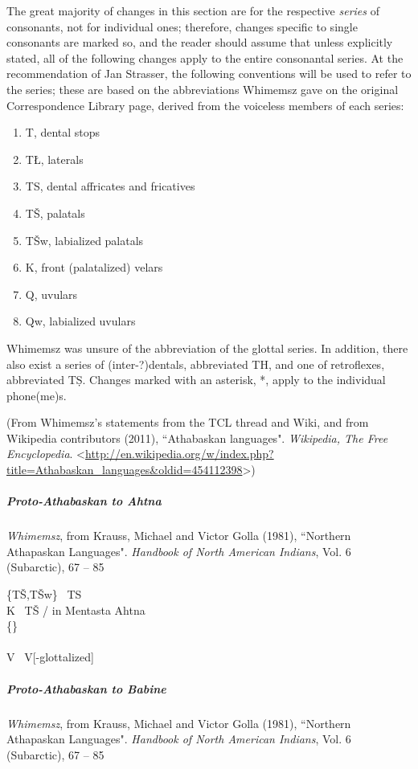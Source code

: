\documentclass[11pt]{article}
\newcommand{\ipa}{\textipa}
\newcommand{\tab}{\hspace{25pt}}
\newcommand{\change}{\textrightarrow}
\begin{document}
\tab The great majority of changes in this section are for the respective \textit{series} of consonants, not for individual ones; therefore, changes specific to single consonants are marked so, and the reader should assume that unless explicitly stated, all of the following changes apply to the entire consonantal series. At the recommendation of Jan Strasser, the following conventions will be used to refer to the series; these are based on the abbreviations Whimemsz gave on the original Correspondence Library page, derived from the voiceless members of each series:
\begin{enumerate}
\item T, dental stops
\item T\L, laterals
\item TS, dental affricates and fricatives
\item T\v{S}, palatals
\item T\v{S}\super w, labialized palatals
\item K, front (palatalized) velars
\item Q, uvulars
\item Q\super w, labialized uvulars
\end{enumerate}
\tab Whimemsz was unsure of the abbreviation of the glottal series. In addition, there also exist a series of (inter-?)dentals, abbreviated TH, and one of retroflexes, abbreviated T\d{S}. Changes marked with an asterisk, *, apply to the individual phone(me)s.

\tab (From Whimemsz's statements from the TCL thread and Wiki, and from Wikipedia contributors (2011), \textquotedblleft Athabaskan languages". \textit{Wikipedia, The Free Encyclopedia}. \textless\url{http://en.wikipedia.org/w/index.php?title=Athabaskan_languages&oldid=454112398}\textgreater)

\subparagraph{Proto-Athabaskan to Ahtna}{\it Whimemsz}, from Krauss, Michael and Victor Golla (1981), ``Northern Athapaskan Languages". {\it Handbook of North American Indians}, Vol. 6 (Subarctic), 67 -- 85

\{T\v{S},T\v{S}\super w\} \change\ TS\\
K \change\ T\v{S} / in Mentasta Ahtna\\
\{\ipa{S(\super w),x}\} \change\ \ipa{s}\\
\ipa{A @ U} \change\ \ipa{a e o}\\
V\ipa{\super P} \change\ V[-glottalized]

\subparagraph{Proto-Athabaskan to Babine}{\it Whimemsz}, from Krauss, Michael and Victor Golla (1981), ``Northern Athapaskan Languages". {\it Handbook of North American Indians}, Vol. 6 (Subarctic), 67 -- 85
\end{document}
